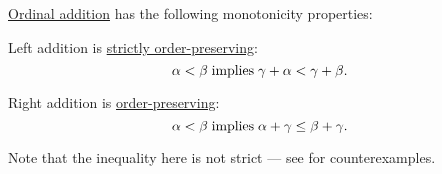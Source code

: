 \begin{proposition}\label{thm:ordinal_addition_is_monotone}
  \hyperref[def:ordinal_arithmetic/addition]{Ordinal addition} has the following monotonicity properties:
  \begin{thmenum}
     Left addition is \hyperref[eq:def:order_function/preserving/strict]{strictly order-preserving}:
    \begin{equation}\label{eq:thm:ordinal_addition_is_monotone/left}
      \alpha < \beta \T{implies} \gamma + \alpha < \gamma + \beta.
    \end{equation}

     Right addition is \hyperref[def:order_function/preserving]{order-preserving}:
    \begin{equation}\label{eq:thm:ordinal_addition_is_monotone/right}
      \alpha < \beta \T{implies} \alpha + \gamma \leq \beta + \gamma.
    \end{equation}

    Note that the inequality here is not strict --- see  for counterexamples.
  \end{thmenum}
\end{proposition}
